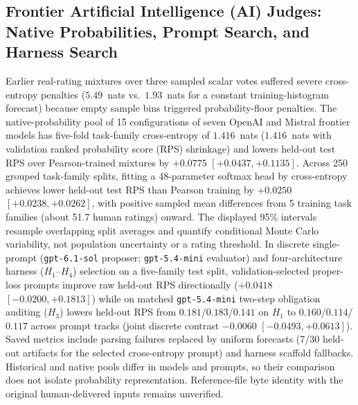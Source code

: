 \subsection{Frontier Artificial Intelligence (AI) Judges: Native Probabilities, Prompt Search, and Harness Search}
Earlier real-rating mixtures over three sampled scalar votes suffered severe cross-entropy penalties ($5.49$~nats vs.\ $1.93$~nats for a constant training-histogram forecast) because empty sample bins triggered probability-floor penalties.
The native-probability pool of 15 configurations of seven OpenAI and Mistral frontier models has five-fold task-family cross-entropy of $1.416$~nats ($1.416$~nats with validation ranked probability score (RPS) shrinkage) and lowers held-out test RPS over Pearson-trained mixtures by $+0.0775$ $[+0.0437, +0.1135]$.
Across 250 grouped task-family splits, fitting a 48-parameter softmax head by cross-entropy achieves lower held-out test RPS than Pearson training by $+0.0250$ $[+0.0238, +0.0262]$, with positive sampled mean differences from 5 training task families (about 51.7 human ratings) onward. The displayed 95\% intervals resample overlapping split averages and quantify conditional Monte Carlo variability, not population uncertainty or a rating threshold.
In discrete single-prompt (\texttt{gpt-6.1-sol} proposer; \texttt{gpt-5.4-mini} evaluator) and four-architecture harness ($H_1$--$H_4$) selection on a five-family test split, validation-selected proper-loss prompts improve raw held-out RPS directionally ($+0.0418$ $[-0.0200, +0.1813]$) while on matched \texttt{gpt-5.4-mini} two-step obligation auditing ($H_3$) lowers held-out RPS from $0.181$/$0.183$/$0.141$ on $H_1$ to $0.160$/$0.114$/$0.117$ across prompt tracks (joint discrete contrast $-0.0060$ $[-0.0493, +0.0613]$).
Saved metrics include parsing failures replaced by uniform forecasts (7/30 held-out artifacts for the selected cross-entropy prompt) and harness scaffold fallbacks. Historical and native pools differ in models and prompts, so their comparison does not isolate probability representation. Reference-file byte identity with the original human-delivered inputs remains unverified.
